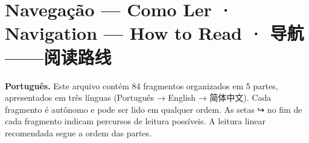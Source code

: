 \documentclass[14pt,openany]{extbook}
\begin{document}
\hypersetup{pageanchor=false}
\frontmatter





\ifdefined\MolambudosKDPNoFolios
  \makeatletter
  \let\ps@plain\ps@empty
  \makeatother
  \pagestyle{empty}
\fi
\ifdefined\MolambudosKDPSafeFolios
  \setlength{\footskip}{6mm}
  \pagestyle{molambudos-kdp-folios}
\fi

\pagecolor{sepiabg}
\color{sepiaink}





\cleardoublepage




\pagestyle{fancy}
\ifdefined\MolambudosKDPNoFolios
  \pagestyle{empty}
\fi
\ifdefined\MolambudosKDPSafeFolios
  \pagestyle{molambudos-kdp-folios}
\fi

\chapter*{Navegação --- Como Ler · Navigation --- How to Read · 导航——阅读路线}

\noindent\textbf{Português.} Este arquivo contém 84 fragmentos organizados em 5 partes,
apresentados em três línguas (Português → English → 简体中文). Cada fragmento é
autônomo e pode ser lido em qualquer ordem. As setas ↪ no fim de cada fragmento
indicam percursos de leitura possíveis. A leitura linear recomendada segue a
ordem das partes.
\end{document}
